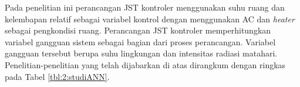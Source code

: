 

Pada penelitian ini perancangan JST kontroler menggunakan suhu ruang dan kelembapan relatif sebagai variabel kontrol dengan menggunakan AC dan \textit{heater} sebagai pengkondisi ruang. Perancangan JST kontroler memperhitungkan variabel gangguan sistem sebagai bagian dari proses perancangan. Variabel gangguan tersebut berupa suhu lingkungan dan intensitas radiasi matahari. Penelitian-penelitian yang telah dijabarkan di atas dirangkum dengan ringkas pada Tabel \ref{tbl:2:studiANN}.

